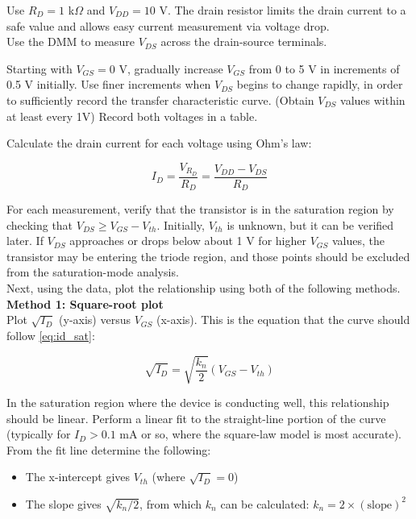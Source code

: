 \documentclass[10pt]{article}
\begin{document}
Use $R_D = 1$ k$\Omega$ and $V_{DD} = 10$ V. The drain resistor limits the drain current to a safe value and allows easy current measurement via voltage drop. \\

Use the DMM to measure $V_{DS}$ across the drain-source terminals.

Starting with $V_{GS} = 0$ V, gradually increase $V_{GS}$ from 0 to 5 V in increments of 0.5 V initially. Use finer increments when $V_{DS}$ begins to change rapidly, in order to sufficiently record the transfer characteristic curve. (Obtain $V_{DS}$ values within at least every 1V) Record both voltages in a table.

Calculate the drain current for each voltage using Ohm's law: 

\begin{equation}
    I_D = \frac{V_{R_D}}{R_D} = \frac{V_{DD} - V_{DS}}{R_D}
\end{equation}

For each measurement, verify that the transistor is in the saturation region by checking that $V_{DS} \geq V_{GS} - V_{th}$. Initially, $V_{th}$ is unknown, but it can be verified later.  If $V_{DS}$ approaches or drops below about 1 V for higher $V_{GS}$ values, the transistor may be entering the triode region, and those points should be excluded from the saturation-mode analysis. \\


Next, using the data, plot the relationship using both of the following methods.\\

\textbf{Method 1: Square-root plot} \\

Plot $\sqrt{I_D}$ (y-axis) versus $V_{GS}$ (x-axis). This is the equation that the curve should follow \ref{eq:id_sat}:

\begin{equation}
    \sqrt{I_D} = \sqrt{\frac{k_n}{2}} (V_{GS} - V_{th})
\end{equation}

In the saturation region where the device is conducting well, this relationship should be linear.  Perform a linear fit to the straight-line portion of the curve (typically for $I_D > 0.1$ mA or so, where the square-law model is most accurate). From the fit line determine the following: 

\begin{itemize}
    \item The x-intercept gives $V_{th}$ (where $\sqrt{I_D} = 0$)
    \item The slope gives $\sqrt{k_n/2}$, from which $k_n$ can be calculated:  $k_n = 2 \times (\text{slope})^2$
\end{itemize}
\end{document}
